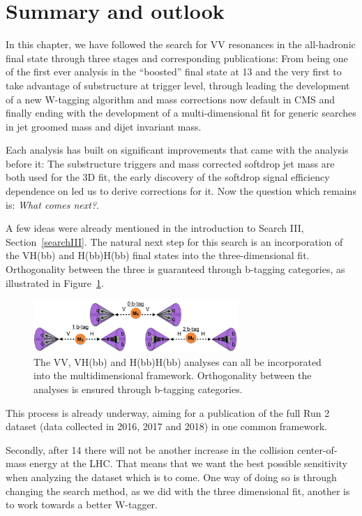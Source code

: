 \clearpage

\section{Summary and outlook}
\label{sec:searchIII:outlook}
In this chapter, we have followed the search for VV resonances in the all-hadronic final state through three stages and corresponding publications: From being one of the first ever analysis in the ``boosted'' final state at 13 \TeV and the very first to take advantage of substructure at trigger level, through leading the development of a new W-tagging algorithm and mass corrections now default in CMS and finally ending with the development of a multi-dimensional fit for generic searches in jet groomed mass and dijet invariant mass.\par
Each analysis has built on significant improvements that came with the analysis before it: The substructure triggers and mass corrected softdrop jet mass are both used for the 3D fit, the early discovery of the softdrop signal efficiency dependence on \PT led us to derive corrections for it. Now the question which remains is: \emph{What comes next?}.\par
A few ideas were already mentioned in the introduction to Search III, Section~\ref{searchIII}. The natural next step for this search is an incorporation of the VH(bb) and H(bb)H(bb) final states into the three-dimensional fit. Orthogonality between the three is guaranteed through b-tagging categories, as illustrated in Figure~\ref{fig:outlook:vvvhhh}.
\begin{figure}[h!]
\centering
\includegraphics[width=0.69\textwidth]{figures/analysis/search3/misc/VVVHHH.png}
\caption{The VV, VH(bb) and H(bb)H(bb) analyses can all be incorporated into the multidimensional framework. Orthogonality between the analyses is ensured through b-tagging categories.}
\label{fig:outlook:vvvhhh}
\end{figure}
This process is already underway, aiming for a publication of the full Run 2 dataset (data collected in 2016, 2017 and 2018) in one common framework.\par
Secondly, after 14 \TeV there will not be another increase in the collision center-of-mass energy at the LHC. That means that we want the best possible sensitivity when analyzing the dataset which is to come. One way of doing so is through changing the search method, as we did with the three dimensional fit, another is to work towards a better W-tagger.\par
